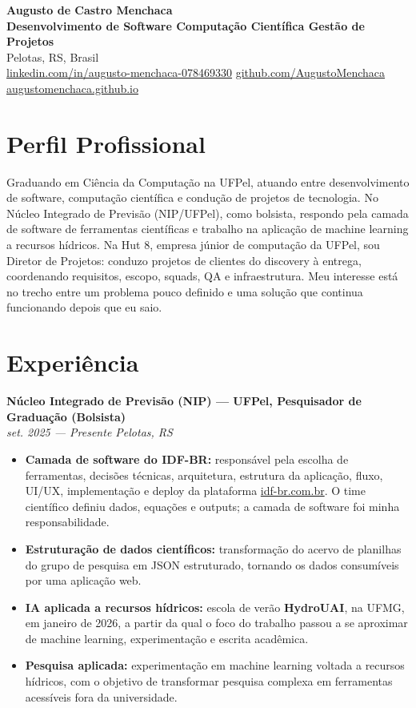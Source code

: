 \documentclass[11pt,a4paper]{article}
\newcommand{\entrada}[2]{%
  \vspace{4pt}%
  \noindent\textbf{#1}\\[1pt]%
  {\small\itshape\color{cinza} #2}\par\vspace{2pt}%
}
\begin{document}
{\LARGE\bfseries Augusto de Castro Menchaca}\\[3pt]
{\large\bfseries Desenvolvimento de Software \textbar{} Computação Científica \textbar{} Gestão de Projetos}\\[4pt]
{\small\color{cinza}%
Pelotas, RS, Brasil\\
\href{https://linkedin.com/in/augusto-menchaca-078469330}{linkedin.com/in/augusto-menchaca-078469330} \textbar{}
\href{https://github.com/AugustoMenchaca}{github.com/AugustoMenchaca} \textbar{}
\href{https://augustomenchaca.github.io/}{augustomenchaca.github.io}%
}

\section*{Perfil Profissional}
Graduando em Ciência da Computação na UFPel, atuando entre desenvolvimento de
software, computação científica e condução de projetos de tecnologia. No Núcleo
Integrado de Previsão (NIP/UFPel), como bolsista, respondo pela camada de
software de ferramentas científicas e trabalho na aplicação de machine learning
a recursos hídricos. Na Hut 8, empresa júnior de computação da UFPel, sou
Diretor de Projetos: conduzo projetos de clientes do discovery à entrega,
coordenando requisitos, escopo, squads, QA e infraestrutura. Meu interesse está
no trecho entre um problema pouco definido e uma solução que continua
funcionando depois que eu saio.

\section*{Experiência}

\entrada{Núcleo Integrado de Previsão (NIP) --- UFPel, Pesquisador de Graduação (Bolsista)}
        {set. 2025 --- Presente \textbar{} Pelotas, RS}
\begin{itemize}
  \item \textbf{Camada de software do IDF-BR:} responsável pela escolha de
        ferramentas, decisões técnicas, arquitetura, estrutura da aplicação,
        fluxo, UI/UX, implementação e deploy da plataforma
        \href{https://www.idf-br.com.br/home/index.html}{idf-br.com.br}. O time
        científico definiu dados, equações e outputs; a camada de software foi
        minha responsabilidade.
  \item \textbf{Estruturação de dados científicos:} transformação do acervo de
        planilhas do grupo de pesquisa em JSON estruturado, tornando os dados
        consumíveis por uma aplicação web.
  \item \textbf{IA aplicada a recursos hídricos:} escola de verão \textbf{HydroUAI},
        na UFMG, em janeiro de 2026, a partir da qual o foco do trabalho passou
        a se aproximar de machine learning, experimentação e escrita
        acadêmica.
  \item \textbf{Pesquisa aplicada:} experimentação em machine learning voltada a
        recursos hídricos, com o objetivo de transformar pesquisa complexa em
        ferramentas acessíveis fora da universidade.
\end{itemize}
\end{document}
